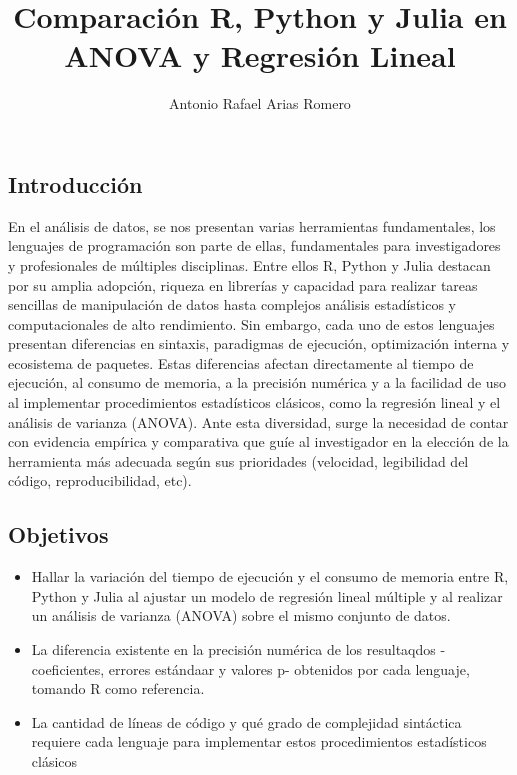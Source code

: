 \documentclass[
  letterpaper,
  DIV=11,
  numbers=noendperiod]{scrartcl}
\title{Comparación R, Python y Julia en ANOVA y Regresión Lineal}
\author{Antonio Rafael Arias Romero}
\date{}
\providecommand{\tightlist}{%
  \setlength{\itemsep}{0pt}\setlength{\parskip}{0pt}}
\begin{document}
\maketitle


\subsection{Introducción}\label{introducciuxf3n}

En el análisis de datos, se nos presentan varias herramientas
fundamentales, los lenguajes de programación son parte de ellas,
fundamentales para investigadores y profesionales de múltiples
disciplinas. Entre ellos R, Python y Julia destacan por su amplia
adopción, riqueza en librerías y capacidad para realizar tareas
sencillas de manipulación de datos hasta complejos análisis estadísticos
y computacionales de alto rendimiento. Sin embargo, cada uno de estos
lenguajes presentan diferencias en sintaxis, paradigmas de ejecución,
optimización interna y ecosistema de paquetes. Estas diferencias afectan
directamente al tiempo de ejecución, al consumo de memoria, a la
precisión numérica y a la facilidad de uso al implementar procedimientos
estadísticos clásicos, como la regresión lineal y el análisis de
varianza (ANOVA). Ante esta diversidad, surge la necesidad de contar con
evidencia empírica y comparativa que guíe al investigador en la elección
de la herramienta más adecuada según sus prioridades (velocidad,
legibilidad del código, reproducibilidad, etc).

\subsection{Objetivos}\label{objetivos}

\begin{itemize}
\tightlist
\item
  Hallar la variación del tiempo de ejecución y el consumo de memoria
  entre R, Python y Julia al ajustar un modelo de regresión lineal
  múltiple y al realizar un análisis de varianza (ANOVA) sobre el mismo
  conjunto de datos.
\item
  La diferencia existente en la precisión numérica de los resultaqdos
  -coeficientes, errores estándaar y valores p- obtenidos por cada
  lenguaje, tomando R como referencia.
\item
  La cantidad de líneas de código y qué grado de complejidad sintáctica
  requiere cada lenguaje para implementar estos procedimientos
  estadísticos clásicos
\end{itemize}
\end{document}
